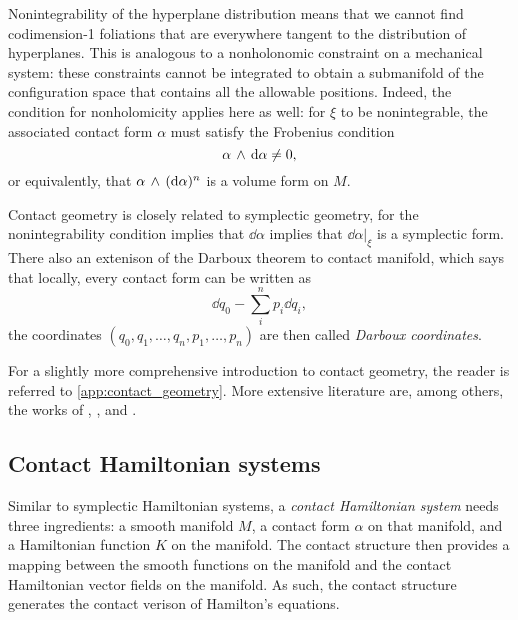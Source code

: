Nonintegrability of the hyperplane distribution means that we cannot find codimension-1 foliations that are everywhere tangent to the distribution of hyperplanes. This is analogous to a nonholonomic constraint on a mechanical system: these constraints cannot be integrated to obtain a submanifold of the configuration space that contains all the allowable positions. Indeed, the condition for nonholomicity applies here as well: for $\xi$ to be nonintegrable, the associated contact form $\alpha$ must satisfy the Frobenius condition 
$$  \alpha\,\wedge\,\dd{\alpha}  \neq 0, $$
or equivalently, that $ \alpha\,\wedge\,(\dd{\alpha})^n $ is a volume form on $M$. 

Contact geometry is closely related to symplectic geometry, for the nonintegrability condition implies that $\dd{\alpha}$ implies that $\dd{\alpha}\vert_{\xi}$ is a symplectic form. There also an extenison of the Darboux theorem to contact manifold, which says that locally, every contact form can be written as
\begin{equation}
    \dd{q}_0 - \sum_i^n p_i \dd{q}_i, 
    \label{eq:contact_darboux}
\end{equation} 
the coordinates $(q_0, q_1, \ldots, q_n, p_1, \ldots, p_n)$ are then called \emph{Darboux coordinates}.

For a slightly more comprehensive introduction to contact geometry, the reader is referred to \cref{app:contact_geometry}. More extensive literature are, among others, the works of \citet{Geiges2008}, \citet{Libermann1987}, \citet{Arnold1989,Arnold1989a} and \citet{Godbillon1969}.

\subsection{Contact Hamiltonian systems}
\label{ssec:contact_ham_systems}
Similar to symplectic Hamiltonian systems, a \emph{contact Hamiltonian system} needs three ingredients: a smooth manifold $M$, a contact form $\alpha$ on that manifold, and a Hamiltonian function $K$ on the manifold. The contact structure then provides a mapping between the smooth functions on the manifold and the contact Hamiltonian vector fields on the manifold. As such, the contact structure generates the contact verison of Hamilton's equations.

